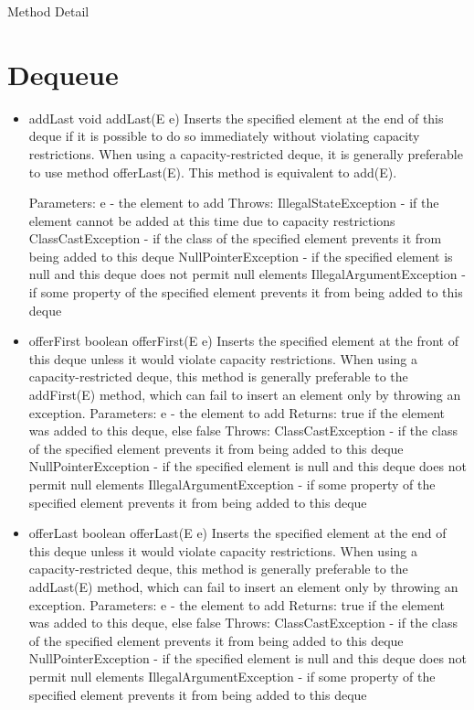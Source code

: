 \documentclass[babel]{book}
\begin{document}
Method Detail
\section{Dequeue}


\begin{itemize} 
	\item addLast
	void addLast(E e)
	Inserts the specified element at the end of this deque if it is possible to do so immediately without violating capacity restrictions. When using a capacity-restricted deque, it is generally preferable to use method offerLast(E).
	This method is equivalent to add(E).
	
	Parameters:
	e - the element to add
	Throws:
	IllegalStateException - if the element cannot be added at this time due to capacity restrictions
	ClassCastException - if the class of the specified element prevents it from being added to this deque
	NullPointerException - if the specified element is null and this deque does not permit null elements
	IllegalArgumentException - if some property of the specified element prevents it from being added to this deque
	
	\item offerFirst
	boolean offerFirst(E e)
	Inserts the specified element at the front of this deque unless it would violate capacity restrictions. When using a capacity-restricted deque, this method is generally preferable to the addFirst(E) method, which can fail to insert an element only by throwing an exception.
	Parameters:
	e - the element to add
	Returns:
	true if the element was added to this deque, else false
	Throws:
	ClassCastException - if the class of the specified element prevents it from being added to this deque
	NullPointerException - if the specified element is null and this deque does not permit null elements
	IllegalArgumentException - if some property of the specified element prevents it from being added to this deque
	
	\item offerLast
	boolean offerLast(E e)
	Inserts the specified element at the end of this deque unless it would violate capacity restrictions. When using a capacity-restricted deque, this method is generally preferable to the addLast(E) method, which can fail to insert an element only by throwing an exception.
	Parameters:
	e - the element to add
	Returns:
	true if the element was added to this deque, else false
	Throws:
	ClassCastException - if the class of the specified element prevents it from being added to this deque
	NullPointerException - if the specified element is null and this deque does not permit null elements
	IllegalArgumentException - if some property of the specified element prevents it from being added to this deque
	

\end{itemize}
\end{document}
